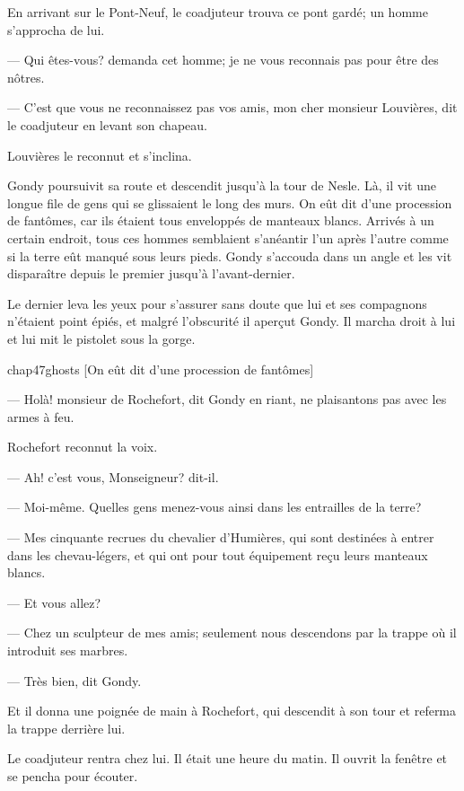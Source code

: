 En arrivant sur le Pont-Neuf, le coadjuteur trouva ce pont gardé; un homme s'approcha de lui.

— Qui êtes-vous? demanda cet homme; je ne vous reconnais pas pour être des nôtres.

— C'est que vous ne reconnaissez pas vos amis, mon cher monsieur Louvières, dit le coadjuteur en levant son chapeau.

Louvières le reconnut et s'inclina.

Gondy poursuivit sa route et descendit jusqu'à la tour de Nesle. Là, il vit une longue file de gens qui se glissaient le long des murs. On eût dit d'une procession de fantômes, car ils étaient tous enveloppés de manteaux blancs. Arrivés à un certain endroit, tous ces hommes semblaient s'anéantir l'un après l'autre comme si la terre eût manqué sous leurs pieds. Gondy s'accouda dans un angle et les vit disparaître depuis le premier jusqu'à l'avant-dernier.

Le dernier leva les yeux pour s'assurer sans doute que lui et ses compagnons n'étaient point épiés, et malgré l'obscurité il aperçut Gondy. Il marcha droit à lui et lui mit le pistolet sous la gorge.

\begin{bwbigpic}
	[\basicscale] 
	{chap47ghosts}
	[On eût dit d'une procession de fantômes]
\end{bwbigpic}

— Holà! monsieur de Rochefort, dit Gondy en riant, ne plaisantons pas avec les armes à feu.

Rochefort reconnut la voix.

— Ah! c'est vous, Monseigneur? dit-il.

— Moi-même. Quelles gens menez-vous ainsi dans les entrailles de la terre?

— Mes cinquante recrues du chevalier d'Humières, qui sont destinées à entrer dans les chevau-légers, et qui ont pour tout équipement reçu leurs manteaux blancs.

— Et vous allez?

— Chez un sculpteur de mes amis; seulement nous descendons par la trappe où il introduit ses marbres.

— Très bien, dit Gondy.

Et il donna une poignée de main à Rochefort, qui descendit à son tour et referma la trappe derrière lui.

Le coadjuteur rentra chez lui. Il était une heure du matin. Il ouvrit la fenêtre et se pencha pour écouter.

